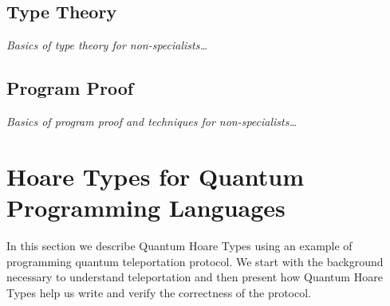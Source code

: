 \documentclass[acmsmall,nonacm,timestamp]{acmart}
\begin{document}
\subsection{Type Theory}
\textit{Basics of type theory for non-specialists\ldots}

\subsection{Program Proof}
\textit{Basics of program proof and techniques for non-specialists\ldots}


\section{Hoare Types for Quantum Programming Languages}
In this section we describe Quantum Hoare Types using an example of programming quantum teleportation protocol. We start with the background necessary to understand teleportation and then present how Quantum Hoare Types help us write and verify the  correctness of the protocol.
\end{document}
